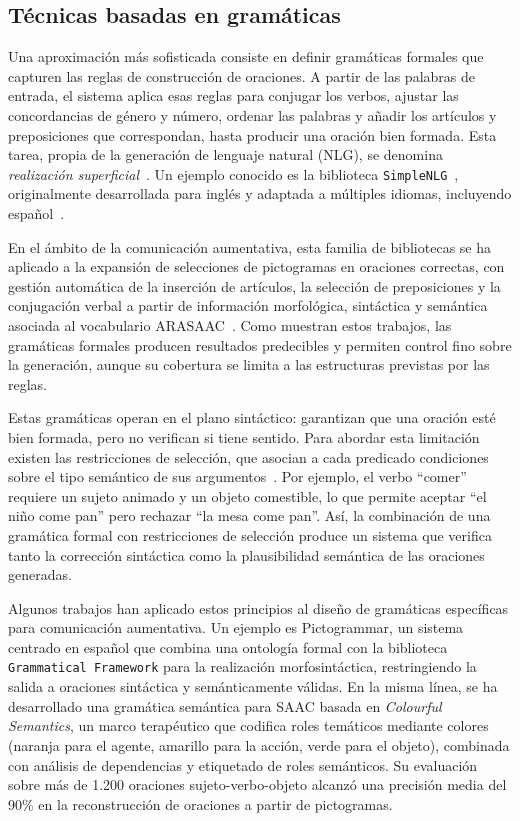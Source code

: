 \subsection{Técnicas basadas en gramáticas}

Una aproximación más sofisticada consiste en definir gramáticas formales que capturen las reglas de construcción de oraciones. A partir de las palabras de entrada, el sistema aplica esas reglas para conjugar los verbos, ajustar las concordancias de género y número, ordenar las palabras y añadir los artículos y preposiciones que correspondan, hasta producir una oración bien formada. Esta tarea, propia de la generación de lenguaje natural (NLG), se denomina \textit{realización superficial}~\cite{gatt2018survey}. Un ejemplo conocido es la biblioteca \texttt{SimpleNLG}~\cite{gatt2009simplenlg}, originalmente desarrollada para inglés y adaptada a múltiples idiomas, incluyendo español~\cite{ramos2017simplenlg, garciamendez2019spanish}.

En el ámbito de la comunicación aumentativa, esta familia de bibliotecas se ha aplicado a la expansión de selecciones de pictogramas en oraciones correctas, con gestión automática de la inserción de artículos, la selección de preposiciones y la conjugación verbal a partir de información morfológica, sintáctica y semántica asociada al vocabulario ARASAAC~\cite{garciamendez2018aac}. Como muestran estos trabajos, las gramáticas formales producen resultados predecibles y permiten control fino sobre la generación, aunque su cobertura se limita a las estructuras previstas por las reglas.

Estas gramáticas operan en el plano sintáctico: garantizan que una oración esté bien formada, pero no verifican si tiene sentido. Para abordar esta limitación existen las restricciones de selección, que asocian a cada predicado condiciones sobre el tipo semántico de sus argumentos~\cite{resnik1996selectional}. Por ejemplo, el verbo ``comer'' requiere un sujeto animado y un objeto comestible, lo que permite aceptar ``el niño come pan'' pero rechazar ``la mesa come pan''. Así, la combinación de una gramática formal con restricciones de selección produce un sistema que verifica tanto la corrección sintáctica como la plausibilidad semántica de las oraciones generadas.

Algunos trabajos han aplicado estos principios al diseño de gramáticas específicas para comunicación aumentativa. Un ejemplo es Pictogrammar, un sistema centrado en español que combina una ontología formal con la biblioteca \texttt{Grammatical Framework} para la realización morfosintáctica, restringiendo la salida a oraciones sintáctica y semánticamente válidas. En la misma línea, se ha desarrollado una gramática semántica para SAAC basada en \textit{Colourful Semantics}, un marco terapéutico que codifica roles temáticos mediante colores (naranja para el agente, amarillo para la acción, verde para el objeto), combinada con análisis de dependencias y etiquetado de roles semánticos. Su evaluación sobre más de 1.200 oraciones sujeto-verbo-objeto alcanzó una precisión media del 90\% en la reconstrucción de oraciones a partir de pictogramas.

